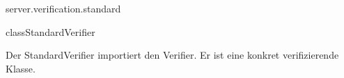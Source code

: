 \begin{texdocpackage}{server.verification.standard}
\label{texdoclet:edu.kit.informatik.studyplan.server.verification.standard}

\begin{texdocclass}{class}{StandardVerifier}
\label{texdoclet:edu.kit.informatik.studyplan.server.verification.standard.StandardVerifier}
\begin{texdocclassintro}
Der StandardVerifier importiert den Verifier. 
 Er ist eine konkret verifizierende Klasse.\end{texdocclassintro}
\begin{texdocclassconstructors}
\end{texdocclassconstructors}
\begin{texdocclassmethods}
\end{texdocclassmethods}
\end{texdocclass}


\end{texdocpackage}



